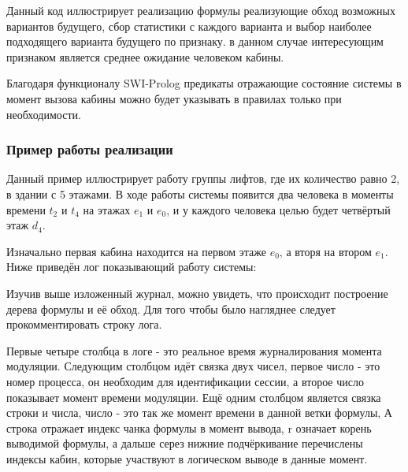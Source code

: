 			Данный код иллюстрирует реализацию формулы реализующие обход возможных вариантов будущего, сбор статистики с каждого варианта и выбор наиболее подходящего варианта будущего по признаку. в данном случае интересующим признаком является среднее ожидание человеком кабины. 

% 

	Благодаря функционалу SWI-Prolog
		предикаты отражающие состояние системы в момент вызова кабины можно будет указывать в правилах только при необходимости.

		\subsubsection{Пример работы реализации}

	Данный пример иллюстрирует работу группы лифтов, где их количество равно 2, в здании с 5 этажами.
		В ходе работы системы появится два человека в моменты времени $t_2$ и $t_4$ на этажах $e_1$ и $e_0$,
		и у каждого человека целью будет четвёртый этаж $d_4$.

	Изначально первая кабина находится на первом этаже $e_0$, а вторя на втором $e_1$.
		Ниже приведён лог показывающий работу системы:


Изучив выше изложенный журнал, можно увидеть, что происходит построение дерева формулы и её обход.
	Для того чтобы было нагляднее следует прокомментировать строку лога.

Первые четыре столбца в логе - это реальное время журналирования момента модуляции.
	Следующим столбцом идёт связка двух чисел, первое число - это номер процесса,
	он необходим для идентификации сессии, а второе число показывает момент времени модуляции.
	Ещё одним столбцом является связка строки и числа, число - это так же момент времени в данной ветки формулы,
	А строка отражает индекс чанка формулы в момент вывода, r означает корень выводимой формулы, а дальше серез нижние подчёркивание перечислены индексы кабин, которые участвуют в логическом выводе в данные момент.

		


